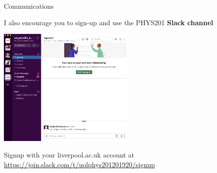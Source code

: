 %
%
%

\begin{frame}{Communications}

I also encourage you to sign-up and use the PHYS201 {\bf Slack channel}\\

\begin{center}
  \includegraphics[width=0.50\textwidth]{./images/year_specific/phys201_slack_channel_201920.png}\\
\end{center}

Signup with your liverpool.ac.uk account at
{\color{blue} \url{https://join.slack.com/t/uolphys201201920/signup}}

\end{frame}

%
%
%

